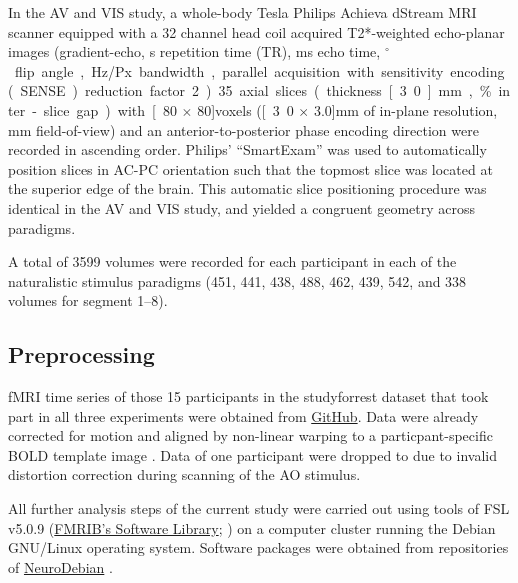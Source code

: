 \documentclass[english]{article}
\begin{document}
In the AV and VIS study, a whole-body \unit[3]{Tesla} Philips Achieva dStream
MRI scanner equipped with a 32 channel head coil acquired T2*-weighted
echo-planar images (gradient-echo, \unit[2]{s} repetition time (TR),
\unit[30]{ms} echo time, \unit[90]{$^{\circ}$} flip angle, \unit[1943]{Hz/Px}
bandwidth, parallel acquisition with sensitivity encoding (SENSE) reduction
factor 2).
35 axial slices (thickness \unit[3.0]{mm}, \unit[10]{\%} inter-slice gap) with
\unit[80 $\times$ 80]{voxels} (\unit[3.0 $\times$ 3.0]{mm} of in-plane
resolution, \unit[240]{mm} field-of-view) and an anterior-to-posterior phase
encoding direction were recorded in ascending order. Philips' ``SmartExam'' was
used to automatically position slices in AC-PC orientation such that the topmost
slice was located at the superior edge of the brain. This automatic slice
positioning procedure was identical in the AV and VIS study, and yielded a
congruent geometry across paradigms.

A total of 3599 volumes were recorded for each participant in each of the
naturalistic stimulus paradigms (451, 441, 438, 488, 462, 439, 542, and 338 volumes for segment 1–8).


\subsection{Preprocessing}


fMRI time series of those 15 participants in the studyforrest dataset that took
part in all three experiments were obtained from
\href{https://github.com/psychoinformatics-de/studyforrest-data-aligned}{GitHub}.
Data were already corrected for motion and aligned by non-linear warping to a
particpant-specific BOLD template image \citep{sengupta2016extension}.
Data of one participant were dropped to due to invalid distortion correction
during scanning of the AO stimulus.

All further analysis steps of the current study were carried out using tools of
FSL v5.0.9 (\href{https://www.fmrib.ox.ac.uk/fsl}{FMRIB's Software Library};
\citep{smith2004fsl}) on a computer cluster running the Debian GNU/Linux
operating system. Software packages were obtained from repositories of
\href{http://neuro.debian.net}{NeuroDebian} \citep{halchenko2012open}.
\end{document}
